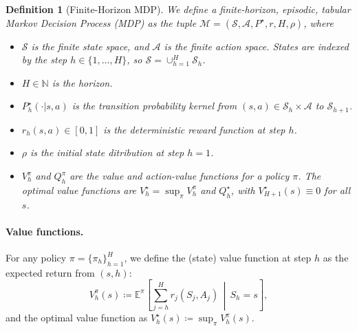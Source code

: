 \documentclass[twoside]{article}
\newtheorem{definition}{Definition}
\begin{document}
\begin{definition}[Finite-Horizon MDP]
We define a finite-horizon, episodic, tabular Markov Decision Process (MDP) as the tuple $\mathcal{M}=(\mathcal{S}, \mathcal{A}, P^{\star}, r, H, \rho)$, where
\begin{itemize}
    \item $\mathcal{S}$ is the finite state space, and $\mathcal{A}$ is the finite action space. States are indexed by the step $h \in \{1,\dots,H\}$, so $\mathcal{S} = \cup_{h=1}^{H} \mathcal{S}_h$.
    \item $H \in \mathbb{N}$ is the horizon.
    \item $P_h^{\star}(\cdot|s,a)$ is the transition probability kernel from $(s,a) \in \mathcal{S}_h \times \mathcal{A}$ to $\mathcal{S}_{h+1}$.
    \item $r_h(s,a) \in [0,1]$ is the deterministic reward function at step $h$.
    \item $\rho$ is the initial state ditribution at step $h=1$.
    \item $V_h^\pi$ and $Q_h^\pi$ are the value and action-value functions for a policy $\pi$. The optimal value functions are $V_h^\star = \sup_\pi V_h^\pi$ and $Q_h^\star$, with $V_{H+1}^\star(s) \equiv 0$ for all $s$.
\end{itemize}
\end{definition}

\paragraph{Value functions.}
For any policy $\pi=\{\pi_h\}_{h=1}^H$, we define the (state) value function at step $h$ as the expected return from $(s,h)$:
\[
V_h^\pi(s)
\coloneqq
\mathbb{E}^\pi\!\left[\sum_{j=h}^{H} r_j(S_j,A_j)\,\middle|\, S_h=s\right],
\]
and the optimal value function as $V_h^\star(s)\coloneqq \sup_{\pi} V_h^\pi(s)$.
\end{document}
